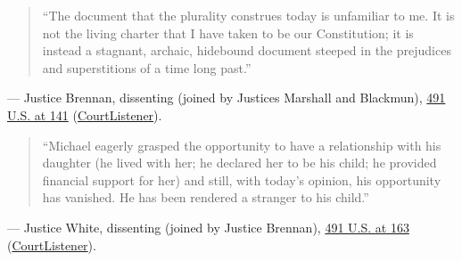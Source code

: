 \documentclass[12pt]{article}
\begin{document}
\begin{quote}
``The document that the plurality construes today is unfamiliar to me. It is not the living charter that I have taken to be our Constitution; it is instead a stagnant, archaic, hidebound document steeped in the prejudices and superstitions of a time long past.''
\end{quote}
\noindent --- Justice Brennan, dissenting (joined by Justices Marshall and Blackmun), \href{https://supreme.justia.com/cases/federal/us/491/110/}{491 U.S. at 141} (\href{https://www.courtlistener.com/opinion/112295/michael-h-v-gerald-d/}{CourtListener}).

\begin{quote}
``Michael eagerly grasped the opportunity to have a relationship with his daughter (he lived with her; he declared her to be his child; he provided financial support for her) and still, with today's opinion, his opportunity has vanished. He has been rendered a stranger to his child.''
\end{quote}
\noindent --- Justice White, dissenting (joined by Justice Brennan), \href{https://supreme.justia.com/cases/federal/us/491/110/}{491 U.S. at 163} (\href{https://www.courtlistener.com/opinion/112295/michael-h-v-gerald-d/}{CourtListener}).
\end{document}
